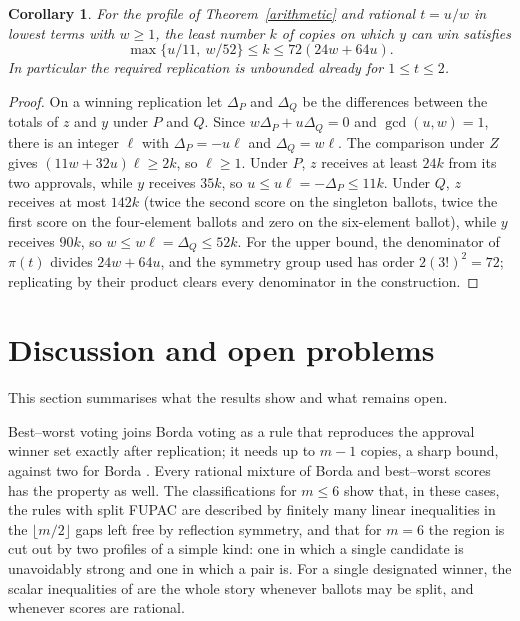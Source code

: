 \documentclass[11pt,a4paper]{article}
\newtheorem{corollary}[theorem]{Corollary}
\theoremstyle{definition}
\theoremstyle{remark}
\begin{document}
\begin{corollary}\label{denom}
For the profile of Theorem~\ref{arithmetic} and rational $t=u/w$ in lowest terms with $w\ge1$, the least number $k$ of copies on which $y$ can win satisfies
\[
 \max\{u/11,\ w/52\}\le k\le72(24w+64u).
\]
In particular the required replication is unbounded already for $1\le t\le2$.
\end{corollary}
\begin{proof}
On a winning replication let $\Delta_P$ and $\Delta_Q$ be the differences between the totals of $z$ and $y$ under $P$ and $Q$. Since $w\Delta_P+u\Delta_Q=0$ and $\gcd(u,w)=1$, there is an integer $\ell$ with $\Delta_P=-u\ell$ and $\Delta_Q=w\ell$. The comparison under $Z$ gives $(11w+32u)\ell\ge2k$, so $\ell\ge1$. Under $P$, $z$ receives at least $24k$ from its two approvals, while $y$ receives $35k$, so $u\le u\ell=-\Delta_P\le11k$. Under $Q$, $z$ receives at most $142k$ (twice the second score on the singleton ballots, twice the first score on the four-element ballots and zero on the six-element ballot), while $y$ receives $90k$, so $w\le w\ell=\Delta_Q\le52k$. For the upper bound, the denominator of $\pi(t)$ divides $24w+64u$, and the symmetry group used has order $2(3!)^2=72$; replicating by their product clears every denominator in the construction.
\end{proof}

\section{Discussion and open problems}\label{sec:discussion}
This section summarises what the results show and what remains open.

Best--worst voting joins Borda voting as a rule that reproduces the approval winner set exactly after replication; it needs up to $m-1$ copies, a sharp bound, against two for Borda \cite[Theorem~3]{tlz}. Every rational mixture of Borda and best--worst scores has the property as well. The classifications for $m\le6$ show that, in these cases, the rules with split FUPAC are described by finitely many linear inequalities in the $\lfloor m/2\rfloor$ gaps left free by reflection symmetry, and that for $m=6$ the region is cut out by two profiles of a simple kind: one in which a single candidate is unavoidably strong and one in which a pair is. For a single designated winner, the scalar inequalities of \cite{tlz} are the whole story whenever ballots may be split, and whenever scores are rational.
\end{document}
